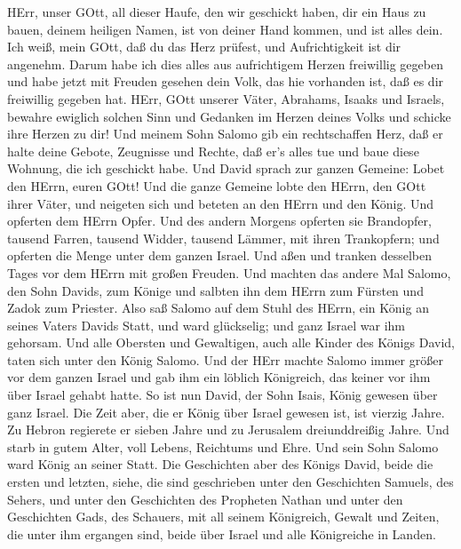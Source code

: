  HErr, unser GOtt, all dieser Haufe, den wir geschickt
haben, dir ein Haus zu bauen, deinem heiligen Namen, ist von deiner Hand
kommen, und ist alles dein.  Ich weiß, mein GOtt, daß du
das Herz prüfest, und Aufrichtigkeit ist dir angenehm. Darum habe ich
dies alles aus aufrichtigem Herzen freiwillig gegeben und habe jetzt mit
Freuden gesehen dein Volk, das hie vorhanden ist, daß es dir freiwillig
gegeben hat.  HErr, GOtt unserer Väter, Abrahams, Isaaks
und Israels, bewahre ewiglich solchen Sinn und Gedanken im Herzen deines
Volks und schicke ihre Herzen zu dir!  Und meinem Sohn
Salomo gib ein rechtschaffen Herz, daß er halte deine Gebote, Zeugnisse
und Rechte, daß er's alles tue und baue diese Wohnung, die ich geschickt
habe.  Und David sprach zur ganzen Gemeine: Lobet den
HErrn, euren GOtt! Und die ganze Gemeine lobte den HErrn, den GOtt ihrer
Väter, und neigeten sich und beteten an den HErrn und den König.
 Und opferten dem HErrn Opfer. Und des andern Morgens
opferten sie Brandopfer, tausend Farren, tausend Widder, tausend Lämmer,
mit ihren Trankopfern; und opferten die Menge unter dem ganzen Israel.
 Und aßen und tranken desselben Tages vor dem HErrn mit
großen Freuden. Und machten das andere Mal Salomo, den Sohn Davids, zum
Könige und salbten ihn dem HErrn zum Fürsten und Zadok zum Priester.
 Also saß Salomo auf dem Stuhl des HErrn, ein König an
seines Vaters Davids Statt, und ward glückselig; und ganz Israel war ihm
gehorsam.  Und alle Obersten und Gewaltigen, auch alle
Kinder des Königs David, taten sich unter den König Salomo.
 Und der HErr machte Salomo immer größer vor dem ganzen
Israel und gab ihm ein löblich Königreich, das keiner vor ihm über
Israel gehabt hatte.  So ist nun David, der Sohn Isais,
König gewesen über ganz Israel.  Die Zeit aber, die er
König über Israel gewesen ist, ist vierzig Jahre. Zu Hebron regierete er
sieben Jahre und zu Jerusalem dreiunddreißig Jahre.  Und
starb in gutem Alter, voll Lebens, Reichtums und Ehre. Und sein Sohn
Salomo ward König an seiner Statt.  Die Geschichten aber
des Königs David, beide die ersten und letzten, siehe, die sind
geschrieben unter den Geschichten Samuels, des Sehers, und unter den
Geschichten des Propheten Nathan und unter den Geschichten Gads, des
Schauers,  mit all seinem Königreich, Gewalt und Zeiten,
die unter ihm ergangen sind, beide über Israel und alle Königreiche in
Landen.
